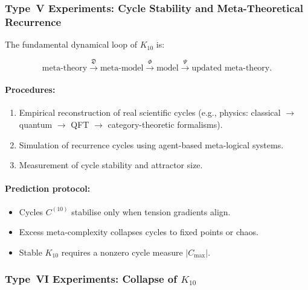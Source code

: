 \subsubsection{Type~V Experiments: Cycle Stability and Meta-Theoretical Recurrence}

The fundamental dynamical loop of $K_{10}$ is:

\[
\text{meta-theory}
   \xrightarrow{\mathfrak{D}}
\text{meta-model}
   \xrightarrow{\Phi}
\text{model}
   \xrightarrow{\Psi}
\text{updated meta-theory}.
\]

\paragraph{Procedures:}

\begin{enumerate}
    \item Empirical reconstruction of real scientific cycles
          (e.g., physics: classical $\to$ quantum $\to$ QFT $\to$
          category-theoretic formalisms).
    \item Simulation of recurrence cycles using agent-based meta-logical
          systems.
    \item Measurement of cycle stability and attractor size.
\end{enumerate}

\paragraph{Prediction protocol:}

\begin{itemize}
    \item Cycles $C^{(10)}$ stabilise only when tension gradients align.
    \item Excess meta-complexity collapses cycles to fixed points or chaos.
    \item Stable $K_{10}$ requires a nonzero cycle measure $|C_{\max}|$.
\end{itemize}



\subsubsection{Type~VI Experiments: Collapse of $K_{10}$}

